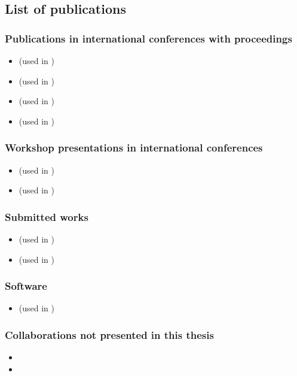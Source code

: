 \subsection*{List of publications}

\subsubsection*{Publications in international conferences with proceedings}

\begin{itemize}
	\item {} (used in )
	\item {} (used in )
	\item {} (used in )
	\item {} (used in )
\end{itemize}

\subsubsection*{Workshop presentations in international conferences}

\begin{itemize}
	\item {} (used in )
	\item {} (used in )
\end{itemize}

\subsubsection*{Submitted works}

\begin{itemize}
	\item {} (used in )
	\item {} (used in )
\end{itemize}

\subsubsection*{Software}

\begin{itemize}
	\item {} (used in )
\end{itemize}

\subsubsection*{Collaborations not presented in this thesis}

\begin{itemize}
	\item {}
	\item {}
\end{itemize}